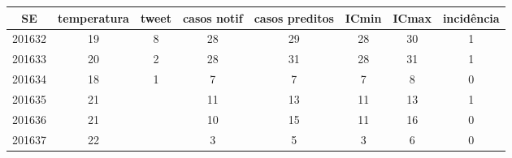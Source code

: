 \begin{tabular}{c|ccccccc}
  \hline
SE & temperatura & tweet & casos notif & casos preditos & ICmin & ICmax & incidência \\ 
  \hline
201632 & 19 & 8 & 28 & 29 & 28 & 30 & 1 \\ 
  201633 & 20 & 2 & 28 & 31 & 28 & 31 & 1 \\ 
  201634 & 18 & 1 & 7 & 7 & 7 & 8 & 0 \\ 
  201635 & 21 &  & 11 & 13 & 11 & 13 & 1 \\ 
  201636 & 21 &  & 10 & 15 & 11 & 16 & 0 \\ 
  201637 & 22 &  & 3 & 5 & 3 & 6 & 0 \\ 
   \hline
\end{tabular}
